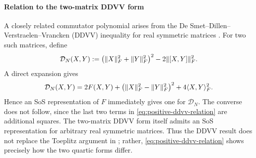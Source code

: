 \paragraph{Relation to the two-matrix DDVV form}

A closely related commutator polynomial arises from the
De Smet--Dillen--Verstraelen--Vrancken (DDVV) inequality for real
symmetric matrices \cite{lu2017,ge2024published}.  For two such
matrices, define
\[
 \mathcal D_N(X,Y)
 :=
 \bigl(\lVert X\rVert_F^2+\lVert Y\rVert_F^2\bigr)^2
 -2\lVert[X,Y]\rVert_F^2.
\]
A direct expansion gives
\begin{equation}\label{eq:positive-ddvv-relation}
 \mathcal D_N(X,Y)
 =
 2F(X,Y)
 +\bigl(\lVert X\rVert_F^2-\lVert Y\rVert_F^2\bigr)^2
 +4\langle X,Y\rangle_F^2.
\end{equation}
Hence an SoS representation of $F$ immediately gives one for
$\mathcal D_N$.  The converse does not follow, since the last two
terms in \eqref{eq:positive-ddvv-relation} are additional squares. 
The two-matrix DDVV form itself admits an SoS representation for
arbitrary real symmetric matrices.  Thus the DDVV result does not
replace the Toeplitz argument in ; rather,
\eqref{eq:positive-ddvv-relation} shows precisely how the two
quartic forms differ.